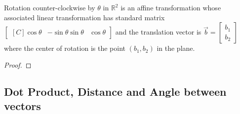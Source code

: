 \begin{proposition} Rotation counter-clockwise by $\theta$ in $\mathbb{R}^2$ is an affine transformation whose associated linear transformation has standard matrix   
$\begin{bmatrix*}[C]
\cos \theta & -\sin \theta
\sin \theta & \cos \theta
\end{bmatrix*}$
and the translation vector is $\vec{b}=\begin{bmatrix}b_1 \\ b_2 \end{bmatrix}$ where the center of rotation is the point $(b_1,b_2)$ in the plane.
\end{proposition}
\begin{proof}
\end{proof}




\subsection{Dot Product, Distance and Angle between vectors}


